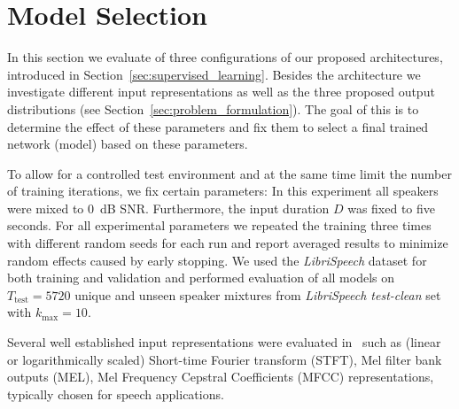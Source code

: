 \section{Model Selection}%
\label{sec:hyperparameters}
%
%

In this section we evaluate of three configurations of our proposed architectures, introduced in Section~\ref{sec:supervised_learning}.
Besides the architecture we investigate different input representations as well as the three proposed output distributions (see Section~\ref{sec:problem_formulation}).
The goal of this is to determine the effect of these parameters and fix them to select a final trained network (model) based on these parameters.
\par
To allow for a controlled test environment and at the same time limit the number of training iterations, we fix certain parameters:
In this experiment all speakers were mixed to 0~dB SNR.\@
Furthermore, the input duration \(D\) was fixed to five seconds.
For all experimental parameters we repeated the training three times with different random seeds for each run and report averaged results to minimize random effects caused by early stopping.
We used the \emph{LibriSpeech} dataset for both training and validation and
performed evaluation of all models on \(T_{\textrm{test}} = 5720\) unique and unseen speaker mixtures from \emph{LibriSpeech test-clean} set with \(k_{\max} = 10\).
\par
Several well established input representations were evaluated in~\cite{stoeter17} such as (linear or logarithmically scaled) Short-time Fourier transform (STFT), Mel filter bank outputs (MEL), Mel Frequency Cepstral Coefficients (MFCC) representations, typically chosen for speech applications.

